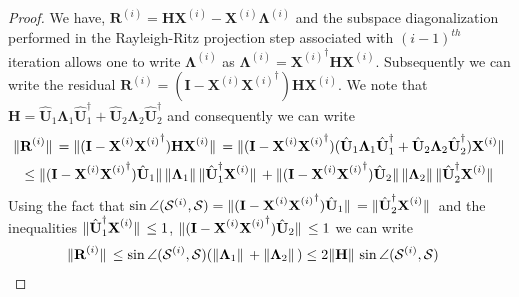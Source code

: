 \documentclass[preprint,3p,number,sort&compress]{elsarticle}
\newcommand{\bH}{\textbf{H}}
\newcommand{\bI}{\textbf{I}}
\newcommand{\bX}{\textbf{X}}
\newcommand{\bR}{\textbf{R}}
\newcommand{\bU}{\textbf{U}}
\newcommand{\bLam}{\boldsymbol{\Lambda}}
\DeclarePairedDelimiter\norm{\lVert}{\rVert\,}%
\begin{document}
\begin{proof}
 We have, $\bR^{(i)}=\bH\bX^{(i)}-\bX^{(i)}\bLam^{(i)}$ and the subspace diagonalization performed in the Rayleigh-Ritz projection step associated with $(i-1)^{th}$ iteration allows one to write $\bLam^{(i)}$ as $\bLam^{(i)}={\bX^{(i)}}^\dagger\bH\bX^{(i)}$. Subsequently we can write the residual $\bR^{(i)}=(\bI-\bX^{(i)}{\bX^{(i)}}^\dagger)\bH\bX^{(i)}$. We note that $\bH=\hat{\bU}_1\bLam_1\hat{\bU}_1^\dagger+\hat{\bU}_2\bLam_2\hat{\bU}_2^\dagger$ and consequently we can write
 \begin{multline*}
  \norm{\bR^{(i)}}=\norm{(\bI-\bX^{(i)}{\bX^{(i)}}^\dagger)\bH\bX^{(i)}}=\norm{(\bI-\bX^{(i)}{\bX^{(i)}}^\dagger)(\hat{\bU}_1\bLam_1\hat{\bU}_1^\dagger+\hat{\bU}_2\bLam_2\hat{\bU}_2^\dagger)\bX^{(i)}}\\
  \leq\norm{(\bI-\bX^{(i)}{\bX^{(i)}}^\dagger)\hat{\bU}_1}\norm{\bLam_1}\norm{\hat{\bU}_1^\dagger\bX^{(i)}}+\norm{(\bI-\bX^{(i)}{\bX^{(i)}}^\dagger)\hat{\bU}_2}\norm{\bLam_2}\norm{\hat{\bU}_2^\dagger\bX^{(i)}}
 \end{multline*}
 Using the fact that $\sin{\angle(\mathcal{S}^{(i)},\mathcal{S})}={\norm{(\bI-\bX^{(i)}{\bX^{(i)}}^\dagger)\hat{\bU}_1} = \norm{\hat{\bU}_2^\dagger\bX^{(i)}}}$ and the inequalities $\norm{\hat{\bU}_1^\dagger\bX^{(i)}}\leq1$, $\norm{(\bI-\bX^{(i)}{\bX^{(i)}}^\dagger)\hat{\bU}_2}\leq1$ we can write
 \begin{align}
  \norm{\bR^{(i)}}&\leq\sin{\angle(\mathcal{S}^{(i)},\mathcal{S})}(\norm{\bLam_1}+\norm{\bLam_2})
\leq2\norm{\bH}\sin{\angle(\mathcal{S}^{(i)},\mathcal{S})}
 \end{align}
\end{proof}
\end{document}
